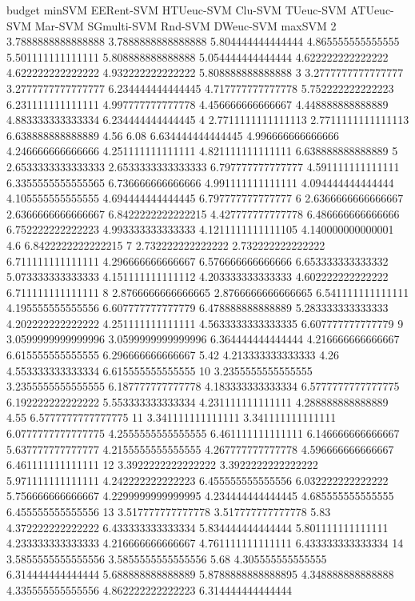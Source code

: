 budget minSVM EERent-SVM HTUeuc-SVM Clu-SVM TUeuc-SVM ATUeuc-SVM Mar-SVM SGmulti-SVM Rnd-SVM DWeuc-SVM maxSVM
2 3.7888888888888888 3.7888888888888888 5.804444444444444 4.865555555555555 5.501111111111111 5.808888888888888 5.054444444444444 4.622222222222222 4.622222222222222 4.932222222222222 5.808888888888888
3 3.2777777777777777 3.2777777777777777 6.234444444444445 4.717777777777778 5.752222222222223 6.231111111111111 4.997777777777778 4.456666666666667 4.448888888888889 4.883333333333334 6.234444444444445
4 2.7711111111111113 2.7711111111111113 6.638888888888889 4.56 6.08 6.634444444444445 4.996666666666666 4.246666666666666 4.251111111111111 4.821111111111111 6.638888888888889
5 2.6533333333333333 2.6533333333333333 6.797777777777777 4.591111111111111 6.3355555555555565 6.736666666666666 4.991111111111111 4.094444444444444 4.105555555555555 4.694444444444445 6.797777777777777
6 2.6366666666666667 2.6366666666666667 6.8422222222222215 4.427777777777778 6.486666666666666 6.752222222222223 4.993333333333333 4.1211111111111105 4.140000000000001 4.6 6.8422222222222215
7 2.732222222222222 2.732222222222222 6.711111111111111 4.296666666666667 6.576666666666666 6.653333333333332 5.073333333333333 4.151111111111112 4.203333333333333 4.602222222222222 6.711111111111111
8 2.8766666666666665 2.8766666666666665 6.541111111111111 4.195555555555556 6.607777777777779 6.478888888888889 5.283333333333333 4.202222222222222 4.251111111111111 4.5633333333333335 6.607777777777779
9 3.0599999999999996 3.0599999999999996 6.364444444444444 4.216666666666667 6.615555555555555 6.296666666666667 5.42 4.213333333333333 4.26 4.553333333333334 6.615555555555555
10 3.2355555555555555 3.2355555555555555 6.187777777777778 4.183333333333334 6.5777777777777775 6.192222222222222 5.553333333333334 4.231111111111111 4.288888888888889 4.55 6.5777777777777775
11 3.341111111111111 3.341111111111111 6.0777777777777775 4.2555555555555555 6.461111111111111 6.146666666666667 5.637777777777777 4.2155555555555555 4.267777777777778 4.596666666666667 6.461111111111111
12 3.3922222222222222 3.3922222222222222 5.971111111111111 4.242222222222223 6.455555555555556 6.032222222222222 5.756666666666667 4.2299999999999995 4.234444444444445 4.685555555555555 6.455555555555556
13 3.517777777777778 3.517777777777778 5.83 4.372222222222222 6.433333333333334 5.834444444444444 5.801111111111111 4.233333333333333 4.216666666666667 4.761111111111111 6.433333333333334
14 3.5855555555555556 3.5855555555555556 5.68 4.305555555555555 6.314444444444444 5.688888888888889 5.8788888888888895 4.348888888888888 4.335555555555556 4.862222222222223 6.314444444444444
